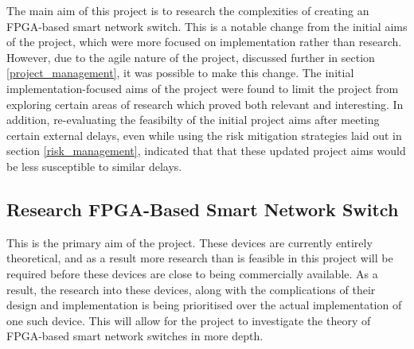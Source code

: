 











The main aim of this project is to research the complexities of creating an FPGA-based smart network switch. This is a notable change from the initial aims of the project, which were more focused on implementation rather than research. However, due to the agile nature of the project, discussed further in section \ref{project_management}, it was possible to make this change.
The initial implementation-focused aims of the project were found to limit the project from exploring certain areas of research which proved both relevant and interesting. In addition, re-evaluating the feasibilty of the initial project aims after meeting certain external delays, even while using the risk mitigation strategies laid out in section \ref{risk_management}, indicated that that these updated project aims would be less susceptible to similar delays.

\subsection{Research FPGA-Based Smart Network Switch}
This is the primary aim of the project. These devices are currently entirely theoretical, and as a result more research than is feasible in this project will be required before these devices are close to being commercially available. As a result, the research into these devices, along with the complications of their design and implementation is being prioritised over the actual implementation of one such device. This will allow for the project to investigate the theory of FPGA-based smart network switches in more depth.

